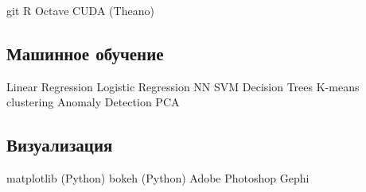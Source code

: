 \documentclass[a4paper]{resume}
\begin{document}
\begin{minipage}[t]{0.35\textwidth} {\Large }
git \textbullet{}  R \textbullet{} Octave \textbullet{} CUDA (Theano)

\sectionspace


\subsection{Машинное обучение}
Linear Regression\textbullet{} Logistic Regression\textbullet{} NN\textbullet{} SVM\textbullet{} Decision Trees
K-means clustering \textbullet{} Anomaly Detection \textbullet{} PCA

\sectionspace 



\subsection{Визуализация}
matplotlib (Python) \textbullet{} bokeh (Python) \textbullet{} Adobe Photoshop \textbullet{} Gephi
\sectionspace



\end{minipage} {\Large }%
\hfill
%
%
\end{document}
